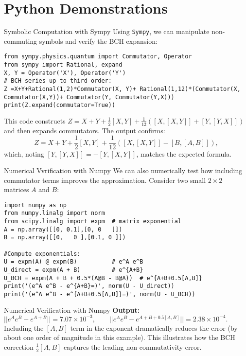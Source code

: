 \documentclass{beamer}
\begin{document}
\section{Python Demonstrations}
\begin{frame}[fragile]{Symbolic Computation with Sympy}
Using \texttt{Sympy}, we can manipulate non-commuting symbols and verify the BCH expansion:
\begin{verbatim}
from sympy.physics.quantum import Commutator, Operator
from sympy import Rational, expand
X, Y = Operator('X'), Operator('Y')
# BCH series up to third order:  
Z =X+Y+Rational(1,2)*Commutator(X, Y)+ Rational(1,12)*(Commutator(X, Commutator(X,Y))+ Commutator(Y, Commutator(Y,X)))
print(Z.expand(commutator=True))
\end{verbatim}

This code constructs $Z = X+Y + \frac{1}{2}[X,Y] + \frac{1}{12}([X,[X,Y]]+[Y,[Y,X]])$ and then expands commutators. The output confirms:
\[
Z = X + Y + \frac{1}{2}[X,Y] + \frac{1}{12}([X,[X,Y]] - [B,[A,B]]),
\]
which, noting $[Y,[Y,X]] = -[Y,[X,Y]]$, matches the expected formula.
\end{frame}

\begin{frame}[fragile]{Numerical Vvrification with Numpy}
We can also numerically test how including commutator terms improves the approximation. Consider two small $2\times 2$ matrices $A$ and $B$:
\begin{verbatim}
import numpy as np
from numpy.linalg import norm
from scipy.linalg import expm  # matrix exponential
A = np.array([[0, 0.1],[0, 0   ]])
B = np.array([[0,   0 ],[0.1, 0 ]])

#Compute exponentials:
U = expm(A) @ expm(B)          # e^A e^B
U_direct = expm(A + B)         # e^{A+B}
U_BCH = expm(A + B + 0.5*(A@B - B@A))  # e^{A+B+0.5[A,B]}
print('(e^A e^B - e^{A+B}=)', norm(U - U_direct))
print('(e^A e^B - e^{A+B+0.5[A,B]}=)', norm(U - U_BCH))

\end{verbatim}
\end{frame}

\begin{frame}[fragile]{Numerical Verification with Numpy}
\textbf{Output:}\
{\footnotesize{}$\displaystyle ||e^A e^B - e^{A+B}|| = 7.07\times 10^{-3}, \qquad
||e^A e^B - e^{A+B+0.5[A,B]}|| = 2.38\times 10^{-4}.$}
\vspace{1ex}
Including the $[A,B]$ term in the exponent dramatically reduces the error (by about one order of magnitude in this example).
This illustrates how the BCH correction $\frac{1}{2}[A,B]$ captures the leading non-commutativity error.
\end{frame}
\end{document}
